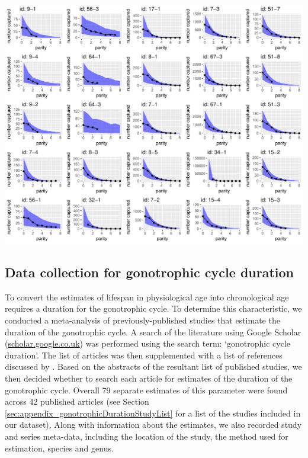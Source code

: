 \documentclass[12pt]{article}
\begin{document}
{
\thispagestyle{empty}
{%
	\centering
	\includegraphics[page=3,scale=.7]{./Figure_files/dissection_ppcs_all}
	\label{fig:dissection_ppc_all3}
	\par
}
\restoregeometry


\subsection{Data collection for gonotrophic cycle duration}\label{sec:dissection_gonotrophicData}
To convert the estimates of lifespan in physiological age into chronological age requires a duration for the gonotrophic cycle. To determine this characteristic, we conducted a meta-analysis of previously-published studies that estimate the duration of the gonotrophic cycle. A search of the literature using Google Scholar (\url{scholar.google.co.uk}) was performed using the search term: `gonotrophic cycle duration'. The list of articles was then supplemented with a list of references discussed by \cite{silver2007mosquito}. Based on the abstracts of the resultant list of published studies, we then decided whether to search each article for estimates of the duration of the gonotrophic cycle. Overall 79 separate estimates of this parameter were found across 42 published articles (see Section \ref{sec:appendix_gonotrophicDurationStudyList} for a list of the studies included in our dataset). Along with information about the estimates, we also recorded study and series meta-data, including the location of the study, the method used for estimation, species and genus.

}
\end{document}
